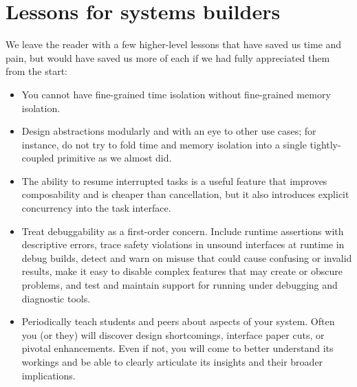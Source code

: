 \section{Lessons for systems builders}
\label{sec:thatsawrap:lessons}

We leave the reader with a few higher-level lessons that have saved us time and pain,
but would have saved us more of each if we had fully appreciated them from the start:
\begin{itemize}
\item You cannot have fine-grained time isolation without fine-grained memory
isolation.

\item Design abstractions modularly and with an eye to other use cases; for instance,
do not try to fold time and memory isolation into a single tightly-coupled primitive
as we almost did.

\item The ability to resume interrupted tasks is a useful feature that improves
composability and is cheaper than cancellation, but it also introduces explicit
concurrency into the task interface.

\item Treat debuggability as a first-order concern.  Include runtime assertions with
descriptive errors, trace safety violations in unsound interfaces at runtime in debug
builds, detect and warn on misuse that could cause confusing or invalid results, make
it easy to disable complex features that may create or obscure problems, and
test and maintain support for running under debugging and diagnostic tools.

\item Periodically teach students and peers about aspects of your system.  Often you
(or they) will discover design shortcomings, interface paper cuts, or pivotal
enhancements.  Even if not, you will come to better understand its workings and be
able to clearly articulate its insights and their broader implications.
\end{itemize}
